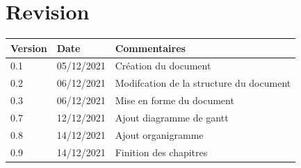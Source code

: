\documentclass[a4paper, twoside, 12pt]{report}
\title{\titleOfDoc}
\author{\authors}
\begin{document}


\chapter*{Revision}
\begin{table}[!ht] %
	\begin{tabular}{ | m{3cm} | m{3cm}| m{8cm} | } 
		\hline
		\textbf{Version} & \textbf{Date} & \textbf{Commentaires}\\
		\hline
			0.1 & 05/12/2021 & Création du document\\
		\hline
			0.2 & 06/12/2021 & Modifcation de la structure du document\\
		\hline
			0.3 & 06/12/2021 & Mise en forme du document\\
		\hline
			0.7 & 12/12/2021 &  Ajout diagramme de gantt\\
		\hline
			0.8 & 14/12/2021 &  Ajout organigramme\\
		\hline
			0.9 & 14/12/2021 &  Finition des chapitres\\
		\hline
	\end{tabular}
\end{table}

\tableofcontents
\newpage



%
%
\end{document}

